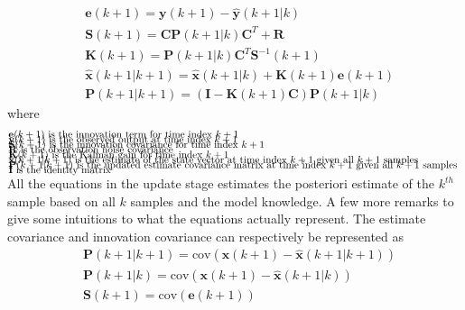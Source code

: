 \begin{align}
	&\textbf{e}(k+1) = \textbf{y}(k+1) - \hat{\textbf{y}}(k+1|k)							\label{eq:Kalman_upd_inno}			\\
	&\textbf{S}(k+1) = \textbf{C}\textbf{P}(k+1|k)\textbf{C}^T + \textbf{R}					\label{eq:Kalman_upd_inno_cov}		\\
	&\textbf{K}(k+1) = \textbf{P}(k+1|k)\textbf{C}^T\textbf{S}^{-1}(k+1)					\label{eq:Kalman_upd_kalman_gain}	\\
	&\hat{\textbf{x}}(k+1|k+1) = \hat{\textbf{x}}(k+1|k) + \textbf{K}(k+1)\textbf{e}(k+1) 	\label{eq:Kalman_upd_est_state}		\\
	&\textbf{P}(k+1|k+1) = (\textbf{I} - \textbf{K}(k+1)\textbf{C})\textbf{P}(k+1|k)		\label{eq:Kalman_upd_est_cov}
\end{align}
where 
\begin{align*}
	&\text{$\textbf{e}(k+1)$ is the innovation term for time index $ k+1 $													}	\\[-1em]
	&\text{$\textbf{y}(k+1)$ is the observed output at time index $ k+1 $													}	\\[-1em]
	&\text{$\textbf{S}(k+1)$ is the innovation covariance for time index $ k+1 $											}	\\[-1em]
	&\text{$\textbf{R}$ is the observation noise covariance																	}	\\[-1em]
	&\text{$\textbf{K}(k+1)$ is the Kalman gain for time index $ k + 1 $													}	\\[-1em]
	&\text{$\hat{\textbf{x}}(k+1|k+1)$ is the estimate of the state vector at time index $ k+1 $ given all $ k+1$ samples	}	\\[-1em]
	&\text{$\textbf{P}(k+1|k+1)$ is the updated estimate covariance matrix at time index $k+1$ given all $ k+1$ samples		}	\\[-1em]
	&\text{$\textbf{I}$ is the identity matrix																				}	\\[-1em]			
\end{align*}
All the equations in the update stage estimates the posteriori estimate of the $ k^{th} $ sample based on all $ k $ samples and the model knowledge. A few more remarks to give some intuitions to what the equations actually represent. The estimate covariance and innovation covariance can respectively be represented as 
\begin{align}
	&\textbf{P}(k+1|k+1) = \text{cov}(\textbf{x}(k+1)-\hat{\textbf{x}}(k+1|k+1))	\\
	&\textbf{P}(k+1|k) = \text{cov}(\textbf{x}(k+1)-\hat{\textbf{x}}(k+1|k)) 		\\
	&\textbf{S}(k+1) = \text{cov}(\textbf{e}(k+1)) 
\end{align}

